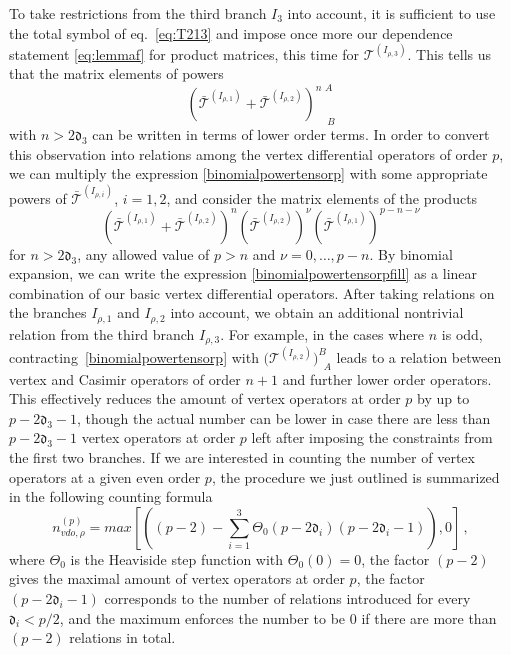 \documentclass{article}
\def\dep{\mathfrak{d}}
\begin{document}
To take restrictions from the third branch $I_3$ into account, it is sufficient to 
use the total symbol of eq.\ \eqref{eq:T213} and impose once more our dependence statement \eqref{eq:lemmaf} 
for product matrices, this time for $\mathcal{T}^{(I_{\rho,3})}$. This tells us that the 
matrix elements of powers 
\begin{equation}
    \left(\bar{\mathcal{T}}^{(I_{\rho,1})}+\bar{\mathcal{T}}^{(I_{\rho,2})}
    \right)^{n\,\,A}_{\hspace{14pt} B}
    \label{binomialpowertensorp}
\end{equation}
with $n > 2\dep_3$ can be written in terms of lower order terms. In order to convert this 
observation into relations among the vertex differential operators of order $p$, we can 
multiply the expression \eqref{binomialpowertensorp} with some appropriate powers of 
$\bar{\mathcal{T}}^{(I_{\rho,i})}$, $i=1,2$, and consider the matrix elements of the 
products
\begin{equation}
    \left(\bar{\mathcal{T}}^{(I_{\rho,1})}+\bar{\mathcal{T}}^{(I_{\rho,2})}\right)^{n} 
    \left(\bar{\mathcal{T}}^{(I_{\rho,2})}\right)^{\nu} 
    \left(\bar{\mathcal{T}}^{(I_{\rho,1})}\right)^{p-n-\nu} 
    \label{binomialpowertensorpfill}
\end{equation}
for $n > 2 \dep_3$, any allowed value of $p > n$ and $\nu = 0, \dots, p-n$. By binomial 
expansion, we can write the expression \eqref{binomialpowertensorpfill} as a linear
combination of our basic vertex differential operators. After taking relations on the
branches $I_{\rho,1}$ and $I_{\rho,2}$ into account, we obtain an additional nontrivial 
relation from the third branch $I_{\rho,3}$.  For example, in the cases where $n$ is odd, 
contracting~\eqref{binomialpowertensorp} with $\bigl(\mathcal{T}^{(I_{\rho,2})}\bigr)^B_{\;\;A}$ 
leads to a relation between vertex and Casimir operators of order $n+1$ and further lower order 
operators. This effectively reduces the amount of vertex operators at order $p$ by up 
to $p-2\dep_3-1$, though the actual number can be lower in case there are less than $p-
2\dep_3-1$ vertex operators at order $p$ left after imposing the constraints from the 
first two branches. If we are interested in counting the number of vertex operators at a given even order $p$, the procedure we just outlined is summarized in the following counting formula
\begin{equation}
    n_{vdo,\rho}^{(p)}=\textit{max}\left[\left((p-2)-\sum_{i=1}^3\Theta_0(p-2\dep_i)(p-2\dep_i-1)\right),0\right]\,,
    \label{eq:countingnormal}
\end{equation}
where $\Theta_0$ is the Heaviside step function with $\Theta_0(0)=0$, the factor $(p-2)$ gives the maximal amount of vertex operators at order $p$, the factor $(p-2\dep_i-1)$ corresponds to the number of relations introduced for every $\dep_i< p/2$, and the maximum enforces the number to be $0$ if there are more than $(p-2)$ relations in total.
\end{document}
